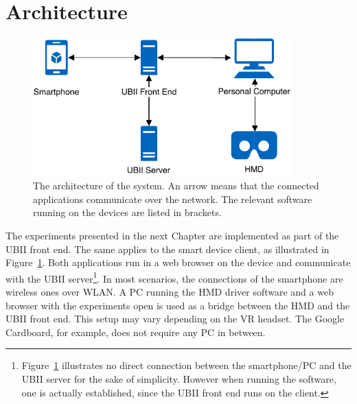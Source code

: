 \section{Architecture}\label{section:architecture}

\begin{figure}[H]
  \centering
  \includegraphics[width=10cm]{figures/implementation/architecture.pdf}
  \caption[The architecture of the system.]{The architecture of the system. An arrow means that the connected applications communicate over the network. The relevant software running on the devices are listed in brackets.}\label{fig:architecture}
\end{figure}

The experiments presented in the next Chapter are implemented as part of the \ac{UBII} front end. The same applies to the smart device client, as illustrated in Figure~\ref{fig:architecture}. Both applications run in a web browser on the device and communicate with the \ac{UBII} server\footnote{Figure~\ref{fig:architecture} illustrates no direct connection between the smartphone/\ac{PC} and the \ac{UBII} server for the sake of simplicity. However when running the software, one is actually established, since the \ac{UBII} front end runs on the client.}. In most scenarios, the connections of the smartphone are wireless ones over \ac{WLAN}. A \ac{PC} running the \ac{HMD} driver software and a web browser with the experiments open is used as a bridge between the \ac{HMD} and the \ac{UBII} front end. This setup may vary depending on the \ac{VR} headset. The Google Cardboard, for example, does not require any \ac{PC} in between.